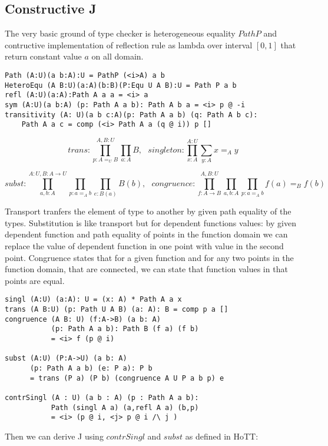 \documentclass{article}
\begin{document}
\subsection{Constructive J}

The very basic ground of type checker is heterogeneous equality $PathP$ and contructive
implementation of reflection rule as lambda over interval $[0,1]$ that
return constant value $a$ on all domain.

\begin{lstlisting}[mathescape=true]
Path (A:U)(a b:A):U = PathP (<i>A) a b
HeteroEqu (A B:U)(a:A)(b:B)(P:Equ U A B):U = Path P a b
refl (A:U)(a:A):Path A a a = <i> a
sym (A:U)(a b:A) (p: Path A a b): Path A b a = <i> p @ -i
transitivity (A: U)(a b c:A)(p: Path A a b) (q: Path A b c):
    Path A a c = comp (<i> Path A a (q @ i)) p []
\end{lstlisting}

$$trans : \prod_{p:A=_U B}^{A,B:U} \prod_{a:A} B,\ \ \ singleton : \prod_{x:A}^{A:U} \sum_{y:A} x =_A y $$

$$subst : \prod_{a,b:A}^{A:U,B:A\rightarrow U} \prod_{p: a =_A b} \prod_{e:B(a)} B(b), \ \ \ 
  congruence : \prod_{f:A\rightarrow B}^{A,B:U} \prod_{a,b:A} \prod_{p:a =_A b} f(a) =_B f(b) $$

Transport tranfers the element of type to another by given path equality of the types.
Substitution is like transport but for dependent functions values: by given dependent function
and path equality of points in the function domain we can replace the value of dependent function
in one point with value in the second point. Congruence states that for a given function
and for any two points in the function domain, that are connected, we can state that function
values in that points are equal.

\begin{lstlisting}[mathescape=true]
singl (A:U) (a:A): U = (x: A) * Path A a x
trans (A B:U) (p: Path U A B) (a: A): B = comp p a []
congruence (A B: U) (f:A->B) (a b: A)
           (p: Path A a b): Path B (f a) (f b)
           = <i> f (p @ i)

subst (A:U) (P:A->U) (a b: A)
      (p: Path A a b) (e: P a): P b
      = trans (P a) (P b) (congruence A U P a b p) e

contrSingl (A : U) (a b : A) (p : Path A a b):
           Path (singl A a) (a,refl A a) (b,p)
           = <i> (p @ i, <j> p @ i /\ j )
\end{lstlisting}

Then we can derive J using $contrSingl$ and $subst$ as defined in HoTT\cite{HoTT}:
\end{document}
